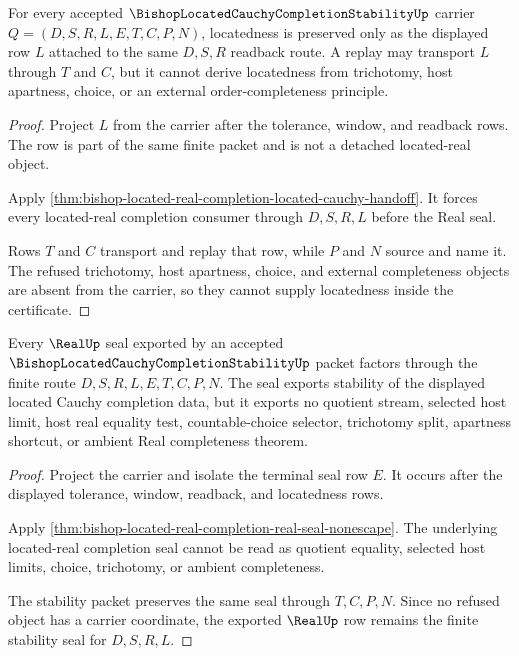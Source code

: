 \begin{theorem}
\label{thm:bishop-located-cauchy-completion-locatedness-preservation}
For every accepted $\BishopLocatedCauchyCompletionStabilityUp$ carrier $Q=(D,S,R,L,E,T,C,P,N)$, locatedness is preserved only as the displayed row $L$ attached to the same $D,S,R$ readback route. A replay may transport $L$ through $T$ and $C$, but it cannot derive locatedness from trichotomy, host apartness, choice, or an external order-completeness principle.
\end{theorem}
\begin{proof}
Project $L$ from the carrier after the tolerance, window, and readback rows. The row is part of the same finite packet and is not a detached located-real object.

Apply \autoref{thm:bishop-located-real-completion-located-cauchy-handoff}. It forces every located-real completion consumer through $D,S,R,L$ before the Real seal.

Rows $T$ and $C$ transport and replay that row, while $P$ and $N$ source and name it. The refused trichotomy, host apartness, choice, and external completeness objects are absent from the carrier, so they cannot supply locatedness inside the certificate.
\end{proof}

\begin{theorem}
\label{thm:bishop-located-cauchy-completion-real-seal-nonescape}
Every $\RealUp$ seal exported by an accepted $\BishopLocatedCauchyCompletionStabilityUp$ packet factors through the finite route $D,S,R,L,E,T,C,P,N$. The seal exports stability of the displayed located Cauchy completion data, but it exports no quotient stream, selected host limit, host real equality test, countable-choice selector, trichotomy split, apartness shortcut, or ambient Real completeness theorem.
\end{theorem}
\begin{proof}
Project the carrier and isolate the terminal seal row $E$. It occurs after the displayed tolerance, window, readback, and locatedness rows.

Apply \autoref{thm:bishop-located-real-completion-real-seal-nonescape}. The underlying located-real completion seal cannot be read as quotient equality, selected host limits, choice, trichotomy, or ambient completeness.

The stability packet preserves the same seal through $T,C,P,N$. Since no refused object has a carrier coordinate, the exported $\RealUp$ row remains the finite stability seal for $D,S,R,L$.
\end{proof}

